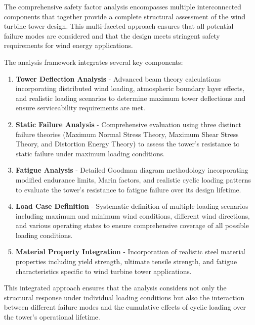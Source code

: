 \documentclass[12pt]{article}
\begin{document}
The comprehensive safety factor analysis encompasses multiple interconnected components that together provide a complete structural assessment of the wind turbine tower design. This multi-faceted approach ensures that all potential failure modes are considered and that the design meets stringent safety requirements for wind energy applications.

The analysis framework integrates several key components:

\begin{enumerate}
    \item \textbf{Tower Deflection Analysis} - Advanced beam theory calculations incorporating distributed wind loading, atmospheric boundary layer effects, and realistic loading scenarios to determine maximum tower deflections and ensure serviceability requirements are met.
    
    \item \textbf{Static Failure Analysis} - Comprehensive evaluation using three distinct failure theories (Maximum Normal Stress Theory, Maximum Shear Stress Theory, and Distortion Energy Theory) to assess the tower's resistance to static failure under maximum loading conditions.
    
    \item \textbf{Fatigue Analysis} - Detailed Goodman diagram methodology incorporating modified endurance limits, Marin factors, and realistic cyclic loading patterns to evaluate the tower's resistance to fatigue failure over its design lifetime.
    
    \item \textbf{Load Case Definition} - Systematic definition of multiple loading scenarios including maximum and minimum wind conditions, different wind directions, and various operating states to ensure comprehensive coverage of all possible loading conditions.
    
    \item \textbf{Material Property Integration} - Incorporation of realistic steel material properties including yield strength, ultimate tensile strength, and fatigue characteristics specific to wind turbine tower applications.
\end{enumerate}

This integrated approach ensures that the analysis considers not only the structural response under individual loading conditions but also the interaction between different failure modes and the cumulative effects of cyclic loading over the tower's operational lifetime.
\end{document}
